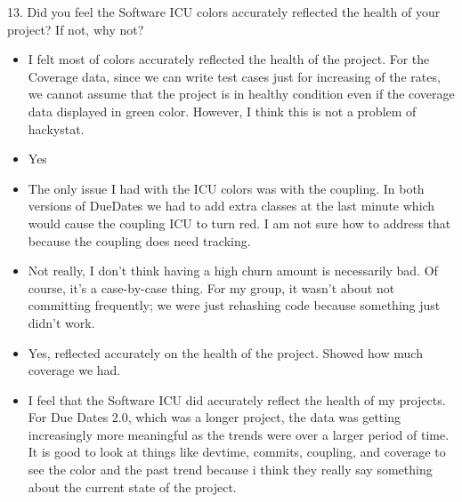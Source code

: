 13. Did you feel the Software ICU colors accurately reflected the health of your project? If not, why not? 
\begin{itemize}
\item I felt most of colors accurately reflected the health of the project. For the Coverage data, since we can write test cases just for increasing of the rates, we cannot assume that the project is in healthy condition even if the coverage data displayed in green color. However, I think this is not a problem of hackystat. 
\item Yes
\item The only issue I had with the ICU colors was with the coupling.  In both versions of DueDates we had to add extra classes at the last minute which would cause the coupling ICU to turn red.  I am not sure how to address that because the coupling does need tracking.
\item Not really, I don't think having a high churn amount is necessarily bad.  Of course, it's a case-by-case thing.  For my group, it wasn't about not committing frequently; we were just rehashing code because something just didn't work.
\item Yes, reflected accurately on the health of the project.  Showed how much coverage we had.
\item I feel that the Software ICU did accurately reflect the health of my projects. For Due Dates 2.0, which was a longer project, the data was getting increasingly more meaningful as the trends were over a larger period of time. It is good to look at things like devtime, commits, coupling, and coverage to see the color and the past trend because i think they really say something about the current state of the project.


\end{itemize}

